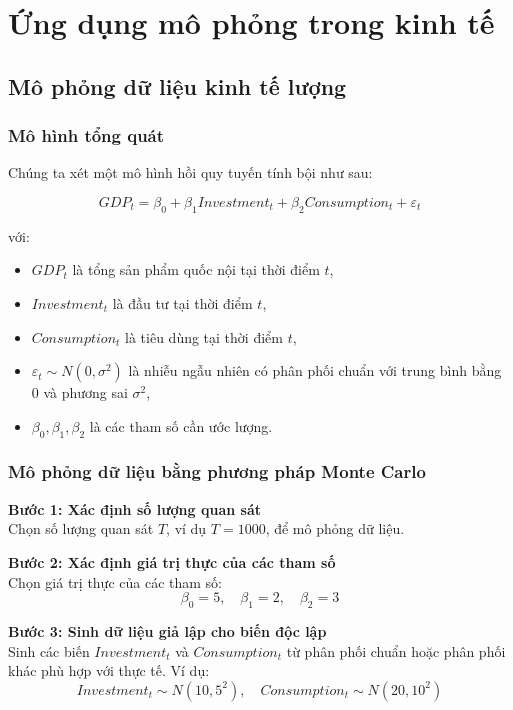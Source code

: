 \chapter{Ứng dụng mô phỏng trong kinh tế}
\section{Mô phỏng dữ liệu kinh tế lượng}
\subsection{Mô hình tổng quát}

Chúng ta xét một mô hình hồi quy tuyến tính bội như sau:

\begin{equation}
GDP_t = \beta_0 + \beta_1 Investment_t + \beta_2 Consumption_t + \varepsilon_t
\end{equation}

với:
\begin{itemize}
    \item $GDP_t$ là tổng sản phẩm quốc nội tại thời điểm $t$,
    \item $Investment_t$ là đầu tư tại thời điểm $t$,
    \item $Consumption_t$ là tiêu dùng tại thời điểm $t$,
    \item $\varepsilon_t \sim N(0, \sigma^2)$ là nhiễu ngẫu nhiên có phân phối chuẩn với trung bình bằng 0 và phương sai $\sigma^2$,
    \item $\beta_0, \beta_1, \beta_2$ là các tham số cần ước lượng.
\end{itemize}

\subsection{Mô phỏng dữ liệu bằng phương pháp Monte Carlo}

\textbf{Bước 1: Xác định số lượng quan sát}  \\
Chọn số lượng quan sát $T$, ví dụ $T = 1000$, để mô phỏng dữ liệu.

\textbf{Bước 2: Xác định giá trị thực của các tham số}  \\
Chọn giá trị thực của các tham số:
\begin{equation}
\beta_0 = 5, \quad \beta_1 = 2, \quad \beta_2 = 3
\end{equation}

\textbf{Bước 3: Sinh dữ liệu giả lập cho biến độc lập}  \\
Sinh các biến $Investment_t$ và $Consumption_t$ từ phân phối chuẩn hoặc phân phối khác phù hợp với thực tế. Ví dụ:
\begin{equation}
Investment_t \sim N(10, 5^2), \quad Consumption_t \sim N(20, 10^2)
\end{equation}

